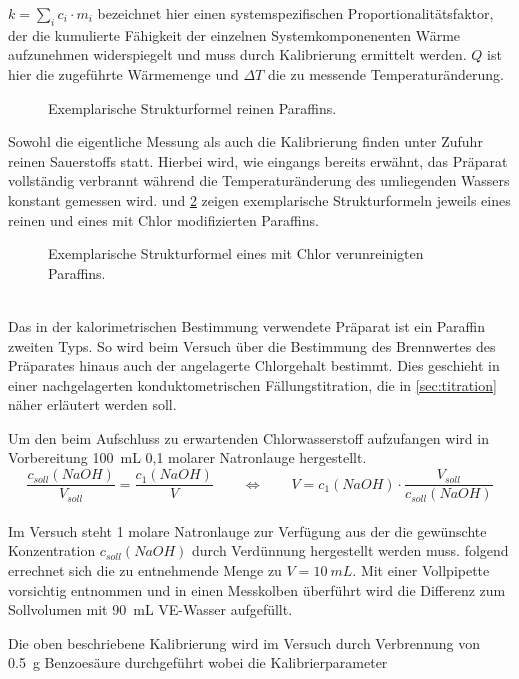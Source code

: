		\(k = \sum_i c_i \cdot m_i\) bezeichnet hier einen systemspezifischen Proportionalitätsfaktor, der die kumulierte Fähigkeit der einzelnen Systemkomponenenten Wärme aufzunehmen
		widerspiegelt und muss durch Kalibrierung ermittelt werden. \(Q\) ist hier die zugeführte Wärmemenge und \(\Delta T\) die zu messende Temperaturänderung.\par\medskip
		\begin{figure}[h]
			\centering
			
			\caption[Exemplarische Strukturformel reinen Paraffins]{Exemplarische Strukturformel reinen Paraffins.}
			\label{fig:paraffin rein}
		\end{figure}
		Sowohl die eigentliche Messung als auch die Kalibrierung finden unter Zufuhr reinen Sauerstoffs statt. Hierbei wird, wie eingangs bereits erwähnt, das Präparat
		vollständig verbrannt während die Temperaturänderung des umliegenden Wassers konstant gemessen wird.
		 und \ref{fig:paraffin ckw} zeigen exemplarische Strukturformeln jeweils eines reinen und eines mit Chlor modifizierten
		Paraffins.
		\begin{figure}[h]
			\centering
			
			\caption[Exemplarische Strukturformel eines mit Chlor verunreinigten Paraffins]{Exemplarische Strukturformel eines mit Chlor verunreinigten Paraffins.}
			\label{fig:paraffin ckw}
		\end{figure}\\
		Das in der kalorimetrischen Bestimmung verwendete Präparat ist ein Paraffin zweiten Typs. So wird beim Versuch über die Bestimmung des Brennwertes des
		Präparates hinaus auch der angelagerte Chlorgehalt bestimmt. Dies geschieht in einer nachgelagerten konduktometrischen Fällungstitration, die in \cref{sec:titration}
		näher erläutert werden soll.\par\medskip
		Um den beim Aufschluss zu erwartenden Chlorwasserstoff aufzufangen wird in Vorbereitung \SI{100}{mL} 0,1 molarer Natronlauge hergestellt.
		\begin{equation}
			\frac{c_{soll}(NaOH)}{V_{soll}} = \frac{c_1(NaOH)}{V} \qquad \Leftrightarrow \qquad V = c_1(NaOH) \cdot \frac{V_{soll}}{c_{soll}(NaOH)}
			\label{eq:verduennung}
		\end{equation}\\
		Im Versuch steht 1 molare Natronlauge zur Verfügung aus der die gewünschte Konzentration \(c_{soll}(NaOH)\) durch Verdünnung hergestellt werden muss. 
		folgend errechnet sich die zu entnehmende Menge zu \(V = \SI{10}{mL}\). Mit einer Vollpipette vorsichtig entnommen und in einen Messkolben überführt wird die Differenz
		zum Sollvolumen mit \SI{90}{mL} VE-Wasser aufgefüllt.\par\medskip
		Die oben beschriebene Kalibrierung wird im Versuch durch Verbrennung von \SI{0,5}{g} Benzoesäure durchgeführt wobei die Kalibrierparameter

